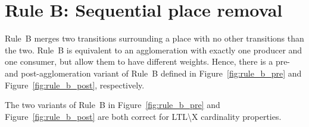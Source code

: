 \section*{Rule B: Sequential place removal}\label{sec:rule_b}
Rule~B merges two transitions surrounding a place with no other transitions than the two.
Rule~B is equivalent to an agglomeration with exactly one producer and one consumer, but allow them to have different weights.
Hence, there is a pre- and post-agglomeration variant of Rule~B defined in Figure~\ref{fig:rule_b_pre} and Figure~\ref{fig:rule_b_post}, respectively.

\begin{theorem}\label{theorem:rule_b}
    The two variants of Rule~B in Figure~\ref{fig:rule_b_pre} and Figure~\ref{fig:rule_b_post} are both correct for LTL\textbackslash X cardinality properties.
\end{theorem}

